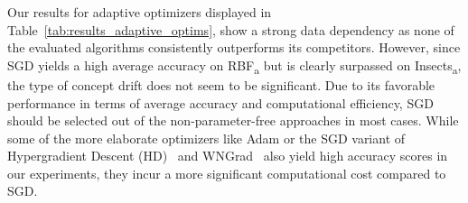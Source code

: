 \documentclass{article} %
\begin{document}
Our results for adaptive optimizers displayed in Table~\ref{tab:results_adaptive_optims}, show a strong data dependency as none of the evaluated algorithms consistently outperforms its competitors.
However, since SGD yields a high average accuracy on RBF\textsubscript{a} but is clearly surpassed on Insects\textsubscript{a}, the type of concept drift does not seem to be significant.
Due to its favorable performance in terms of average accuracy and computational efficiency, SGD should be selected out of the non-parameter-free approaches in most cases.
While some of the more elaborate optimizers like Adam or the SGD variant of Hypergradient Descent (HD)~\citep{baydinOnlineLearningRate2018} and WNGrad~\citep{wuWNGradLearnLearning2020} also yield high accuracy scores in our experiments, they incur a more significant computational cost compared to SGD.
\end{document}
